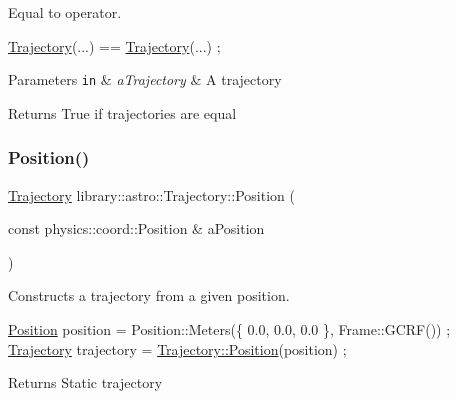 Equal to operator. 


\begin{DoxyCode}
\hyperlink{classlibrary_1_1astro_1_1_trajectory_a8e5c7740915ca947e067c0f419ac1c65}{Trajectory}(...) == \hyperlink{classlibrary_1_1astro_1_1_trajectory_a8e5c7740915ca947e067c0f419ac1c65}{Trajectory}(...) ;
\end{DoxyCode}



\begin{DoxyParams}[1]{Parameters}
\mbox{\tt in}  & {\em a\+Trajectory} & A trajectory \\
\hline
\end{DoxyParams}
\begin{DoxyReturn}{Returns}
True if trajectories are equal 
\end{DoxyReturn}
\mbox{\label{classlibrary_1_1astro_1_1_trajectory_a39e9a50f84016cb53ca36d61809dc058}} 
\subsubsection{\texorpdfstring{Position()}{Position()}}
{\footnotesize\ttfamily \hyperlink{classlibrary_1_1astro_1_1_trajectory}{Trajectory} library\+::astro\+::\+Trajectory\+::\+Position (\begin{DoxyParamCaption}\item[{const physics\+::coord\+::\+Position \&}]{a\+Position }\end{DoxyParamCaption})\hspace{0.3cm}{\ttfamily [static]}}



Constructs a trajectory from a given position. 


\begin{DoxyCode}
\hyperlink{classlibrary_1_1astro_1_1_trajectory_a39e9a50f84016cb53ca36d61809dc058}{Position} position = Position::Meters(\{ 0.0, 0.0, 0.0 \}, Frame::GCRF()) ;
\hyperlink{classlibrary_1_1astro_1_1_trajectory_a8e5c7740915ca947e067c0f419ac1c65}{Trajectory} trajectory = \hyperlink{classlibrary_1_1astro_1_1_trajectory_a39e9a50f84016cb53ca36d61809dc058}{Trajectory::Position}(position) ;
\end{DoxyCode}


\begin{DoxyReturn}{Returns}
Static trajectory 
\end{DoxyReturn}
\mbox{\label{classlibrary_1_1astro_1_1_trajectory_a6f6afc6bcd8880d7debaa98a79bfa4e6}} 
